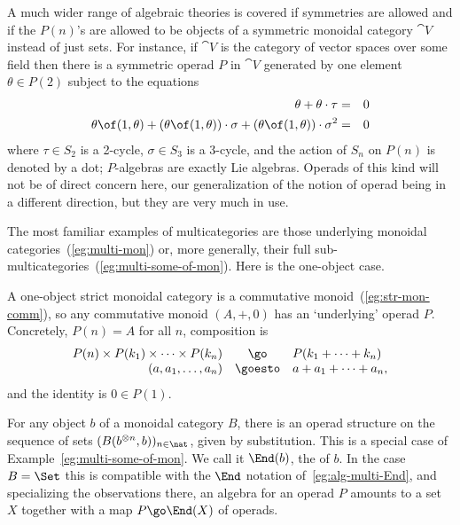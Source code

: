 \begin{example}	
A much wider range of algebraic
theories is covered if symmetries are
allowed and if the $P(n)$'s are allowed to be objects of a symmetric
monoidal category $\cat{V}$ instead of just sets.  For instance, if
$\cat{V}$ is the category of vector spaces over some field then there is a
symmetric operad $P$ in $\cat{V}$ generated by one element $\theta\in P(2)$
subject to the equations
%
\begin{eqnarray*}
\theta + \theta\cdot\tau	&=	&0	\\
\theta \of (1, \theta)
+ (\theta \of (1, \theta))\cdot \sigma
+ (\theta \of (1, \theta))\cdot \sigma^2
				&=	&0
\end{eqnarray*}
%
where $\tau\in S_2$ is a 2-cycle, $\sigma\in S_3$ is a 3-cycle, and the
action of $S_n$ on $P(n)$ is denoted by a dot; $P$-algebras are exactly
Lie%
%
%
algebras.  Operads of this kind will not be of direct concern here,
our generalization of the notion of operad being in a different direction,
but they are very much in use.
\end{example}%
%
%
%

The most familiar examples of multicategories are those underlying%
%
%
monoidal
categories~(\ref{eg:multi-mon}) or, more generally, their full
sub-multicategories~(\ref{eg:multi-some-of-mon}).  Here is the one-object
case.

\begin{example}	%
%
%
%
%
A one-object strict monoidal category is a commutative
monoid~(\ref{eg:str-mon-comm}), so any commutative%
%
%
monoid $(A,+,0)$ has an
`underlying' operad $P$.  Concretely, $P(n)=A$ for all $n$, composition is
\[
\begin{array}{rcl}
P(n) \times P(k_1) \times\cdots\times P(k_n)	&\go	&
P(k_1 +\cdots + k_n)	\\
(a, a_1, \ldots, a_n)	&\goesto	&a + a_1 + \cdots + a_n,
\end{array}
\]
and the identity is $0\in P(1)$.
\end{example}

\begin{example}	%
%
%
%
%
%
For any object $b$ of a monoidal category $B$, there is an operad structure
on the sequence of sets $(B(b^{\otimes n}, b))_{n\in\nat}$, given by
substitution.  This is a special case of
Example~\ref{eg:multi-some-of-mon}.  We call it $\End(b)$,%
% 
% 
the
 of $b$.  In the case $B = \Set$ this is
compatible with the $\End$ notation of~\ref{eg:alg-multi-End}, and
specializing the observations there, an algebra%
%
%
for an operad $P$ amounts
to a set $X$ together with a map $P \go \End(X)$ of operads.
\end{example}

